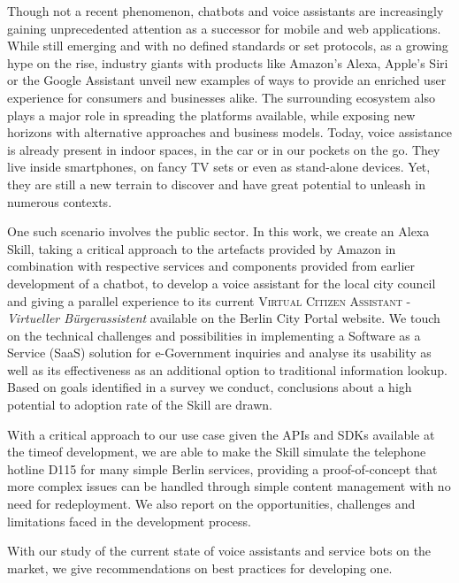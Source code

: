 Though not a recent phenomenon, chatbots and voice assistants are increasingly gaining unprecedented attention as a successor for mobile and web applications. While still emerging and with no defined standards or set protocols, as a growing hype on the rise, %
industry giants with products like Amazon's Alexa, Apple's Siri or the Google Assistant %
unveil new examples of ways to provide an enriched user experience for consumers and businesses alike. The surrounding ecosystem also plays a major role in spreading the platforms available, while exposing new horizons with alternative approaches and business models. Today, voice assistance is already present in indoor spaces, in the car or in our pockets on the go. 
They live inside smartphones, on fancy TV sets or even as stand-alone devices. Yet, they are still a new terrain to discover and have great potential to unleash in numerous contexts. 

One such scenario involves the public sector. In this work, we create an Alexa Skill, taking a critical approach to the artefacts provided by Amazon in combination with respective services and components provided from earlier development of a chatbot, to develop a voice assistant for the local city council and 
giving a parallel experience to its current \textsc{Virtual Citizen Assistant} - \textit{Virtueller Bürgerassistent} %
available on %
the Berlin City Portal website. We touch on the technical challenges and possibilities in implementing a Software as a Service (SaaS) solution for e-Government inquiries and analyse its usability as well as its effectiveness as an additional option to traditional information lookup. Based on goals identified in a survey we conduct, conclusions about a high potential to adoption rate of the Skill are drawn. %

With a critical approach to our use case %
given the APIs and SDKs available at the timeof development, we are able to make the Skill simulate the telephone hotline D115 for many simple Berlin services, providing a proof-of-concept that more complex issues can be handled through simple content management with no need for redeployment. %
We also report on the opportunities, challenges and limitations faced in the development process.

With our study of the current state of voice assistants and service bots on the market, we give recommendations on best practices for developing one. %



